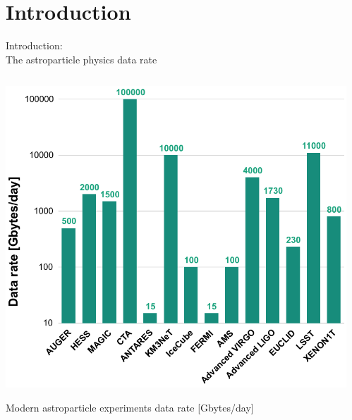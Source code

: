 \section{Introduction}

\begin{frame}
\titlepage
\end{frame}

\begin{frame}{Introduction: \\The astroparticle physics data rate}
\small
\begin{columns}
  \begin{column}[t]{0.45\textwidth}
    \begin{center}
      \includegraphics[width=1\textwidth]{pics/appec_base4.pdf}
    \end{center}
    \vspace{-2\parsep}
    \small Modern astroparticle experiments data rate [Gbytes/day]\footnotemark[1] %
  \end{column}
  \hfill
  \begin{column}[t]{0.53\textwidth}

\end{column}
\end{columns}
\end{frame}
